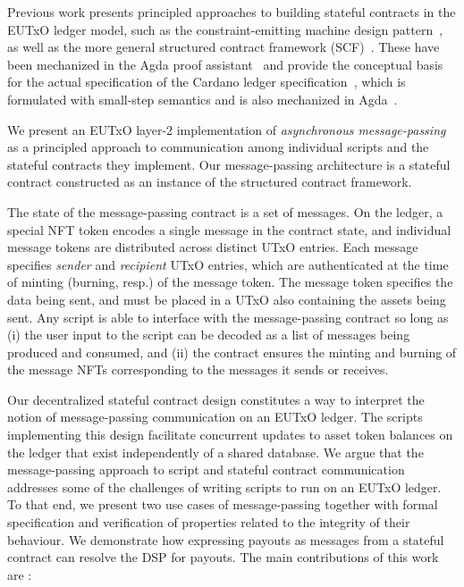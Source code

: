 Previous work presents principled approaches to building stateful contracts in the
EUTxO ledger model,
such as the constraint-emitting machine design pattern~\cite{eutxo},
as well as the more general structured contract framework (SCF)~\cite{structured}.
%
These have been mechanized in the Agda proof assistant~\cite{agda}
and provide the conceptual basis for the actual specification
of the Cardano ledger specification~\cite{shelley,alonzo},
which is formulated with small-step semantics
and is also mechanized in Agda~\cite{agdaspec}.

We present an EUTxO layer-2 implementation of \emph{asynchronous message-passing} as a
principled approach to communication among individual scripts
and the stateful contracts they implement. Our message-passing architecture is
a stateful contract constructed as an instance of the structured contract
framework.

The state of the message-passing contract is a set of messages.
On the ledger, a special NFT token encodes a single message in the contract state,
and individual message tokens are distributed across distinct UTxO entries.
Each message specifies \emph{sender} and \emph{recipient} UTxO entries, which
are authenticated at the time of minting (burning, resp.) of the message token.
The message token specifies the data being sent, and must be placed in a UTxO also
containing the assets being sent. Any script is able to interface
with the message-passing contract so long as (i) the user input to the script can be
decoded as a list of messages being produced and consumed, and (ii)
the contract ensures the minting and burning of the message NFTs corresponding to
the messages it sends or receives.

Our decentralized stateful contract design constitutes a way to interpret the notion
of message-passing communication on an EUTxO ledger. The scripts implementing
this design
facilitate concurrent updates to asset token balances on the ledger
that exist independently of a shared database.
We argue that the message-passing approach to script and stateful contract communication
addresses some of the challenges of writing scripts to run on an EUTxO ledger.
To that end, we
present two use cases of message-passing together with formal specification and
verification of properties related to the integrity of their behaviour. We demonstrate
how expressing payouts as messages from a stateful contract can resolve the DSP
for payouts. The main contributions of this work are :

